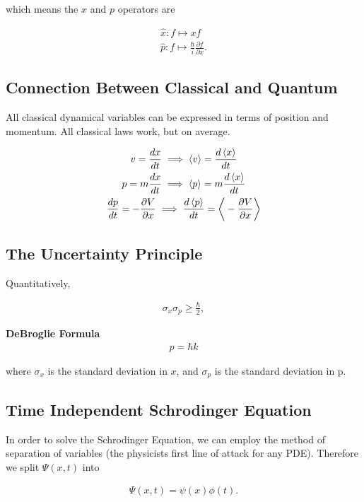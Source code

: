 \documentclass{article}
\begin{document}
\noindent which means the $x$ and $p$ operators are

\begin{gather*}
    \hat{x}: f \mapsto xf \\
    \hat{p}: f \mapsto \frac{\hbar}{i} \frac{\partial f}{\partial x}.
\end{gather*}

\subsection{Connection Between Classical and Quantum}
All classical dynamical variables can be expressed in terms of position and momentum. All classical laws work, but on average.

\begin{gather*}
    v = \frac{dx}{dt} \implies \braket{v} = \frac{d\braket{x}}{dt} \\
    p = m\frac{dx}{dt} \implies \braket{p} = m \frac{d\braket{x}}{dt} \\
    \frac{dp}{dt} = -\frac{\partial V}{\partial x} \implies \frac{d\braket{p}}{dt} = \bigg \langle -\frac{\partial V}{\partial x} \bigg \rangle
\end{gather*}

\subsection{The Uncertainty Principle}
Quantitatively,

\begin{gather*}
    \sigma_{x} \sigma_{p} \geq \frac{\hbar}{2},
\end{gather*}

\noindent \textbf{DeBroglie Formula} \\
\begin{gather*}
    p = \hbar k
\end{gather*}

\noindent where $\sigma_{x}$ is the standard deviation in $x$, and $\sigma_{p}$ is the standard deviation in p.

\subsection{Time Independent Schrodinger Equation}
In order to solve the Schrodinger Equation, we can employ the method of separation of variables (the physicists first line of attack for any PDE). Therefore we split $\Psi(x,t)$ into

\begin{gather*}
    \Psi(x,t) = \psi(x)\phi(t).
\end{gather*}
\end{document}
